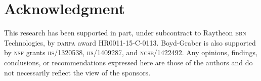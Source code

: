 \section*{Acknowledgment}

This research has been supported in part, under subcontract to Raytheon \textsc{bbn} Technologies, by \textsc{darpa} award HR0011-15-C-0113. Boyd-Graber
is also supported by \textsc{nsf} grants \textsc{iis}/1320538,
\textsc{iis}/1409287, and \textsc{ncse}/1422492.  Any opinions, findings,
conclusions, or recommendations expressed here are those of the authors and do
not necessarily reflect the view of the sponsors.
